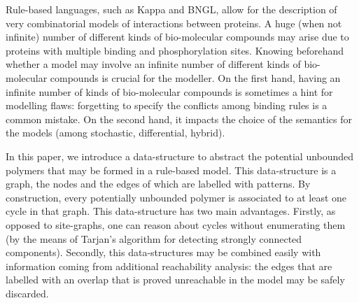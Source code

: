 Rule-based languages, such as Kappa and BNGL, allow for the description of very combinatorial models of interactions between proteins. A huge (when not infinite) number of different kinds of bio-molecular compounds may arise
 due to proteins with multiple binding and phosphorylation sites. Knowing beforehand whether a model may involve an infinite number of different kinds of bio-molecular compounds is crucial for the modeller. On the first hand, having an infinite number of kinds of bio-molecular compounds is sometimes a hint for modelling flaws: forgetting to specify
the conflicts among binding rules is a common mistake. On the second hand,
it impacts the choice of  the semantics for the models (among stochastic, differential, hybrid).

In this paper, we introduce a data-structure to abstract the potential unbounded polymers that may be formed in a rule-based model. This data-structure is a graph, the nodes and the edges of which are labelled with patterns. By construction,  every potentially unbounded polymer is associated to at least one cycle in that graph. This data-structure has two main advantages. Firstly, as opposed to site-graphs, one can reason about cycles without enumerating them (by the means of Tarjan's algorithm for detecting strongly connected components). Secondly, this data-structures may be combined easily with information coming from additional reachability analysis: the edges that are labelled with an overlap that is proved unreachable in the model may be safely discarded.
